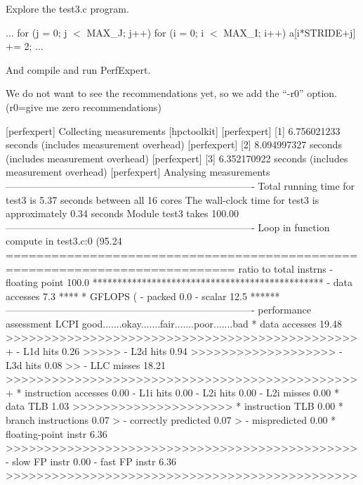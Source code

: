 Explore the test3.c program.

\begin{prompt}
...
for (j = 0; j $<$ MAX_J; j++)
 for (i = 0; i $<$ MAX_I; i++)
   a[i*STRIDE+j] += 2;
...
\end{prompt}

And compile and run PerfExpert.

We do not want to see the recommendations yet, so we add the ``-r0'' option.  (r0=give me zero recommendations)

\begin{prompt}
[perfexpert] Collecting measurements [hpctoolkit]
[perfexpert]    [1] 6.756021233 seconds (includes measurement overhead)
[perfexpert]    [2] 8.094997327 seconds (includes measurement overhead)
[perfexpert]    [3] 6.352170922 seconds (includes measurement overhead)
[perfexpert] Analysing measurements
----------------------------------------------------------------------------
Total running time for test3 is 5.37 seconds between all 16 cores
The wall-clock time for test3 is approximately 0.34 seconds
Module test3 takes 100.00%
----------------------------------------------------------------------------
Loop in function compute in test3.c:0 (95.24%
============================================================================
ratio to total instrns    %
 - floating point      100.0 ***********************************************
 - data accesses         7.3 ****
* GFLOPS (%
 - packed                0.0
 - scalar               12.5 ******
----------------------------------------------------------------------------
performance assessment  LCPI good.......okay.......fair.......poor.......bad
* data accesses        19.48 >>>>>>>>>>>>>>>>>>>>>>>>>>>>>>>>>>>>>>>>>>>>>>+
 - L1d hits             0.26 >>>>>
 - L2d hits             0.94 >>>>>>>>>>>>>>>>>>>
 - L3d hits             0.08 >>
 - LLC misses          18.21 >>>>>>>>>>>>>>>>>>>>>>>>>>>>>>>>>>>>>>>>>>>>>>+
* instruction accesses  0.00
 - L1i hits             0.00
 - L2i hits             0.00
 - L2i misses           0.00
* data TLB              1.03 >>>>>>>>>>>>>>>>>>>>>
* instruction TLB       0.00
* branch instructions   0.07 >
 - correctly predicted  0.07 >
 - mispredicted         0.00
* floating-point instr  6.36 >>>>>>>>>>>>>>>>>>>>>>>>>>>>>>>>>>>>>>>>>>>>>>
 - slow FP instr        0.00
 - fast FP instr        6.36 >>>>>>>>>>>>>>>>>>>>>>>>>>>>>>>>>>>>>>>>>>>>>>
\end{prompt}

